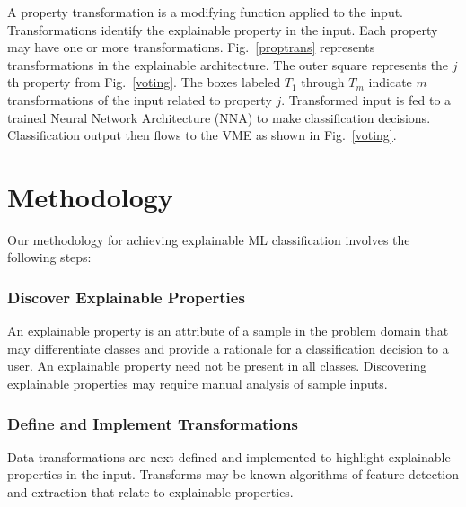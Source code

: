 \documentclass[conference]{IEEEtran}
\begin{document}
A property transformation is a modifying function applied to the input.  Transformations identify the explainable property in the input.  Each property may have one or more transformations.   Fig.~\ref{proptrans} represents transformations in the explainable architecture.  The outer square represents the $j$th property from Fig.~\ref{voting}.  The boxes labeled $T_1$ through $T_m$ indicate $m$ transformations of the input related to property $j$.  Transformed input is fed to a trained Neural Network Architecture (NNA) to make classification decisions.  Classification output then flows to the VME as shown in Fig.~\ref{voting}.

\section{Methodology}
 
Our methodology for achieving explainable ML classification involves the following steps:

\subsubsection{Discover Explainable Properties}
An explainable property is an attribute of a sample in the problem domain that may differentiate classes and provide a rationale for a classification decision to a user.   An explainable property need not be present in all classes.  Discovering explainable properties may require manual analysis of sample inputs.

\subsubsection{Define and Implement Transformations}
Data transformations are next defined and implemented to highlight explainable properties in the input.  Transforms may be known algorithms of feature detection and extraction that relate to explainable properties.
\end{document}
